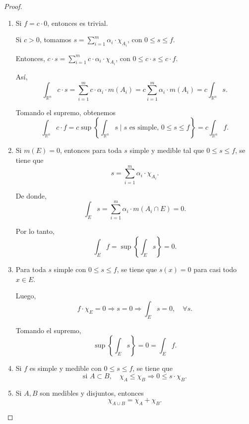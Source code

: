 \begin{proof}
    \begin{enumerate}
        \item Si $f = c \cdot 0$, entonces es trivial.  
    
        Si $c > 0$, tomamos $s = \sum_{i=1}^{m} \alpha_i \cdot \chi_{A_i}$, con $0 \leq s \leq f$.  
    
        Entonces, $c \cdot s = \sum_{i=1}^{m} c \cdot \alpha_i \cdot \chi_{A_i}$, con $0 \leq c \cdot s \leq c \cdot f$.  
    
        Así,  
        $$ 
        \int_{\mathbb{R}^n} c \cdot s = \sum_{i=1}^{m} c \cdot \alpha_i \cdot m(A_i) = c \sum_{i=1}^{m} \alpha_i \cdot m(A_i) = c \int_{\mathbb{R}^n} s.
        $$  
    
        Tomando el supremo, obtenemos  
        $$ 
        \int_{\mathbb{R}^n} c \cdot f = c \sup \left\{ \int_{\mathbb{R}^n} s \mid s \text{ es simple, } 0 \leq s \leq f \right\} = c \int_{\mathbb{R}^n} f.
        $$  
    
        \item Si $m(E) = 0$, entonces para toda $s$ simple y medible tal que $0 \leq s \leq f$, se tiene que  
        $$ 
        s = \sum_{i=1}^{m} \alpha_i \cdot \chi_{A_i}.
        $$  
    
        De donde,  
        $$ 
        \int_{E} s = \sum_{i=1}^{m} \alpha_i \cdot m(A_i \cap E) = 0.
        $$  
    
        Por lo tanto,  
        $$ 
        \int_E f = \sup \left\{ \int_E s \right\} = 0.
        $$  
    
        \item Para toda $s$ simple con $0 \leq s \leq f$, se tiene que $s(x) = 0$ para casi todo $x \in E$.  
    
        Luego,  
        $$ 
        f \cdot \chi_E = 0 \Rightarrow s = 0 \Rightarrow \int_E s = 0, \quad \forall s.
        $$  
    
        Tomando el supremo,  
        $$ 
        \sup \left\{ \int_E s \right\} = 0 = \int_E f.
        $$  
    
        \item Si $f$ es simple y medible con $0 \leq s \leq f$, se tiene que  
        $$ 
        \text{si } A \subset B, \quad \chi_A \leq \chi_B \Rightarrow 0 \leq s \cdot \chi_B.
        $$  
    
        \item  Si $A, B$ son medibles y disjuntos, entonces  
        $$ 
        \chi_{A \cup B} = \chi_A + \chi_B.
        $$  
    

\end{enumerate}
\end{proof}
